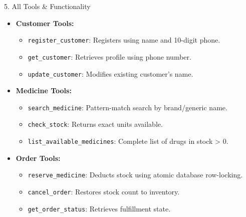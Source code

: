 \documentclass{beamer}
\begin{document}
\begin{frame}{5. All Tools \& Functionality}
    \begin{itemize}
        \item \textbf{Customer Tools:}
        \begin{itemize}
            \item \texttt{register\_customer}: Registers using name and 10-digit phone.
            \item \texttt{get\_customer}: Retrieves profile using phone number.
            \item \texttt{update\_customer}: Modifies existing customer's name.
        \end{itemize}
        \item \textbf{Medicine Tools:}
        \begin{itemize}
            \item \texttt{search\_medicine}: Pattern-match search by brand/generic name.
            \item \texttt{check\_stock}: Returns exact units available.
            \item \texttt{list\_available\_medicines}: Complete list of drugs in stock > 0.
        \end{itemize}
        \item \textbf{Order Tools:}
        \begin{itemize}
            \item \texttt{reserve\_medicine}: Deducts stock using atomic database row-locking.
            \item \texttt{cancel\_order}: Restores stock count to inventory.
            \item \texttt{get\_order\_status}: Retrieves fulfillment state.
        \end{itemize}
    \end{itemize}
\end{frame}
\end{document}
